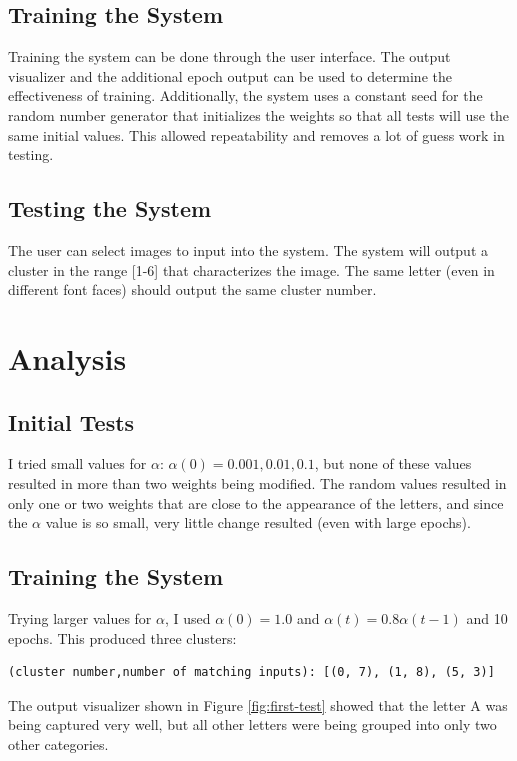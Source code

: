 \documentclass[12pt,letterpaper,oneside]{report}
\begin{document}
\subsection{Training the System}
Training the system can be done through the user interface. The output visualizer and the additional epoch output can be used to determine the effectiveness of training. Additionally, the system uses a constant seed for the random number generator that initializes the weights so that all tests will use the same initial values. This allowed repeatability and removes a lot of guess work in testing.

\subsection{Testing the System}
The user can select images to input into the system. The system will output a cluster in the range [1-6] that characterizes the image. The same letter (even in different font faces) should output the same cluster number.

\clearpage
\section{Analysis}


\subsection{Initial Tests}
I tried small values for $\alpha$: $\alpha(0) = 0.001, 0.01, 0.1$, but none of these values resulted in more than two weights being modified. The random values resulted in only one or two weights that are close to the appearance of the letters, and since the $\alpha$ value is so small, very little change resulted (even with large epochs).

\subsection{Training the System}
Trying larger values for $\alpha$, I used $\alpha(0) = 1.0$ and $\alpha(t) = 0.8\alpha(t-1)$ and 10 epochs. This produced three clusters: 
\begin{verbatim}
(cluster number,number of matching inputs): [(0, 7), (1, 8), (5, 3)]
\end{verbatim}

The output visualizer shown in Figure \ref{fig:first-test} showed that the letter A was being captured very well, but all other letters were being grouped into only two other categories.
\end{document}
